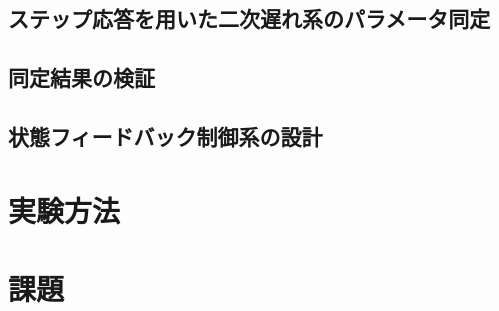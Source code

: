\documentclass[12pt]{jsarticle}
\begin{document}
\subsection{ステップ応答を用いた二次遅れ系のパラメータ同定}
\subsection{同定結果の検証}
\subsection{状態フィードバック制御系の設計}
\section{実験方法}
\section{課題}
\end{document}
